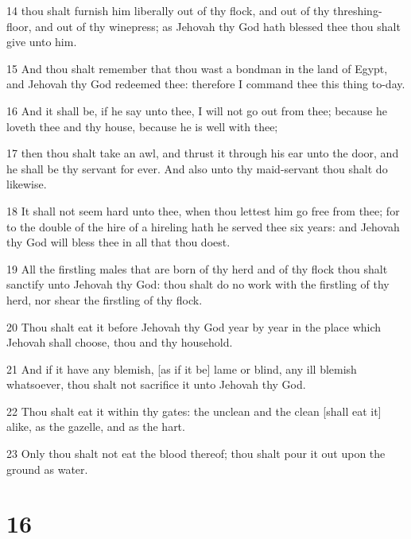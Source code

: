 \par 14 thou shalt furnish him liberally out of thy flock, and out of thy threshing-floor, and out of thy winepress; as Jehovah thy God hath blessed thee thou shalt give unto him.
\par 15 And thou shalt remember that thou wast a bondman in the land of Egypt, and Jehovah thy God redeemed thee: therefore I command thee this thing to-day.
\par 16 And it shall be, if he say unto thee, I will not go out from thee; because he loveth thee and thy house, because he is well with thee;
\par 17 then thou shalt take an awl, and thrust it through his ear unto the door, and he shall be thy servant for ever. And also unto thy maid-servant thou shalt do likewise.
\par 18 It shall not seem hard unto thee, when thou lettest him go free from thee; for to the double of the hire of a hireling hath he served thee six years: and Jehovah thy God will bless thee in all that thou doest.
\par 19 All the firstling males that are born of thy herd and of thy flock thou shalt sanctify unto Jehovah thy God: thou shalt do no work with the firstling of thy herd, nor shear the firstling of thy flock.
\par 20 Thou shalt eat it before Jehovah thy God year by year in the place which Jehovah shall choose, thou and thy household.
\par 21 And if it have any blemish, [as if it be] lame or blind, any ill blemish whatsoever, thou shalt not sacrifice it unto Jehovah thy God.
\par 22 Thou shalt eat it within thy gates: the unclean and the clean [shall eat it] alike, as the gazelle, and as the hart.
\par 23 Only thou shalt not eat the blood thereof; thou shalt pour it out upon the ground as water.

\chapter{16}

